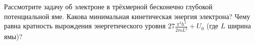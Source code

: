 \documentclass[__main__.tex]{subfiles}
\begin{document}
Рассмотрите задачу об электроне в трёхмерной бесконечно глубокой потенциальной яме. Какова минимальная кинетическая энергия электрона? Чему равна кратность вырождения энергетического уровня $27\frac{\pi^2\hbar^2}{2mL^2}+U_0$ (где $L$ ширина ямы)?\\ 

\end{document}
